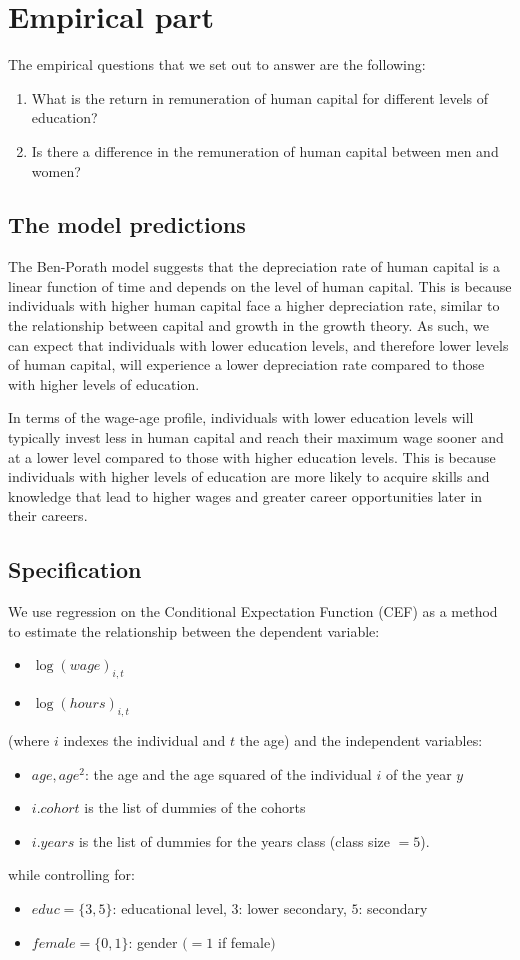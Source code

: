 \documentclass[12pt]{article}
\begin{document}
\section{Empirical part}
The empirical questions that we set out to answer are the following:
\begin{enumerate}
    \item What is the return in remuneration of human capital for different levels of education?
    \item Is there a difference in the remuneration of human capital between men and women?
\end{enumerate}
\subsection{The model predictions}
The Ben-Porath model suggests that the depreciation rate of human capital is a linear function of time and depends on
the level of human capital. This is because individuals with higher human capital face a higher depreciation rate,
similar to the relationship between capital and growth in the growth theory. As such, we can expect that individuals
with lower education levels, and therefore lower levels of human capital, will experience a lower depreciation rate
compared to those with higher levels of education. \par
In terms of the wage-age profile, individuals with lower education levels will typically invest less in human capital
and reach their maximum wage sooner and at a lower level compared to those with higher education levels. This is because
individuals with higher levels of education are more likely to acquire skills and knowledge that lead to higher wages
and greater career opportunities later in their careers.
\subsection{Specification}
We use regression on the Conditional Expectation Function (CEF) as a method to estimate the relationship between the
dependent variable:
\begin{itemize}
    \item $\log(wage)_{i,t}$
    \item $\log(hours)_{i,t}$
\end{itemize}
(where $i$ indexes the individual and $t$ the age) and the independent variables:
\begin{itemize}
    \item $age, age^2$: the age and the age squared of the individual $i$ of the year $y$
    \item $i.cohort$ is the list of dummies of the cohorts
    \item $i.years$ is the list of dummies for the years class (class size $=5$).
\end{itemize}
while controlling for:
\begin{itemize}
    \item $educ=\{3,5\}$: educational level, $3$: lower secondary, $5$: secondary
    \item $female=\{0,1\}$: gender $(=1$ if female$)$
\end{itemize}
\end{document}

